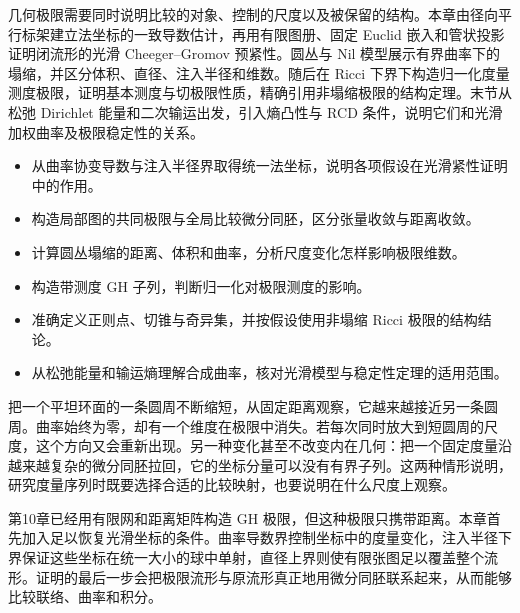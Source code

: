 
% 
% 


\begin{chapterabstract}
几何极限需要同时说明比较的对象、控制的尺度以及被保留的结构。本章由径向平行标架建立法坐标的一致导数估计，再用有限图册、固定 Euclid 嵌入和管状投影证明闭流形的光滑 Cheeger--Gromov 预紧性。圆丛与 Nil 模型展示有界曲率下的塌缩，并区分体积、直径、注入半径和维数。随后在 Ricci 下界下构造归一化度量测度极限，证明基本测度与切极限性质，精确引用非塌缩极限的结构定理。末节从松弛 Dirichlet 能量和二次输运出发，引入熵凸性与 RCD 条件，说明它们和光滑加权曲率及极限稳定性的关系。
\end{chapterabstract}

\begin{learninggoals}
	\begin{itemize}
		\item 从曲率协变导数与注入半径界取得统一法坐标，说明各项假设在光滑紧性证明中的作用。
		\item 构造局部图的共同极限与全局比较微分同胚，区分张量收敛与距离收敛。
		\item 计算圆丛塌缩的距离、体积和曲率，分析尺度变化怎样影响极限维数。
		\item 构造带测度 GH 子列，判断归一化对极限测度的影响。
		\item 准确定义正则点、切锥与奇异集，并按假设使用非塌缩 Ricci 极限的结构结论。
		\item 从松弛能量和输运熵理解合成曲率，核对光滑模型与稳定性定理的适用范围。
	\end{itemize}
\end{learninggoals}

把一个平坦环面的一条圆周不断缩短，从固定距离观察，它越来越接近另一条圆周。曲率始终为零，却有一个维度在极限中消失。若每次同时放大到短圆周的尺度，这个方向又会重新出现。另一种变化甚至不改变内在几何：把一个固定度量沿越来越复杂的微分同胚拉回，它的坐标分量可以没有有界子列。这两种情形说明，研究度量序列时既要选择合适的比较映射，也要说明在什么尺度上观察。

\ProseParagraphBreak
第10章已经用有限网和距离矩阵构造 GH 极限，但这种极限只携带距离。本章首先加入足以恢复光滑坐标的条件。曲率导数界控制坐标中的度量变化，注入半径下界保证这些坐标在统一大小的球中单射，直径上界则使有限张图足以覆盖整个流形。证明的最后一步会把极限流形与原流形真正地用微分同胚联系起来，从而能够比较联络、曲率和积分。

